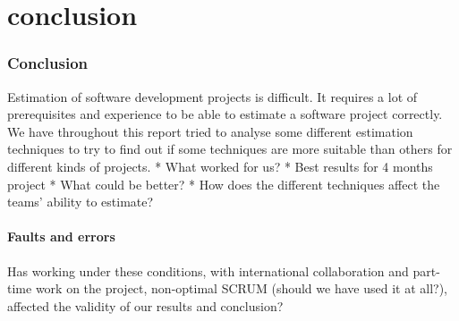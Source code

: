 \part{conclusion}
\section{Conclusion}
Estimation of software development projects is difficult. It requires a lot of prerequisites and experience to
be able to estimate a software project correctly. We have throughout this report tried to analyse some different
estimation techniques to try to find out if some techniques are more suitable than others for different kinds of
projects.
* What worked for us?
* Best results for 4 months project
* What could be better?
* How does the different techniques affect the teams' ability to estimate?

\subsection{Faults and errors}
Has working under these conditions, with international collaboration and part-time work on the project, non-optimal SCRUM (should we have used it at all?), affected the validity of our results and conclusion?
